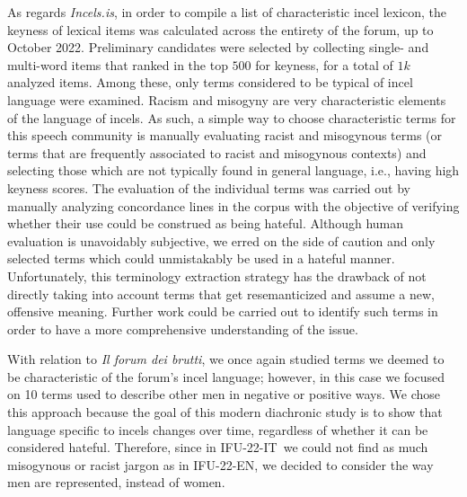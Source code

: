 \documentclass[11pt]{article}
\newcommand{\dsENcorpus}{IFU-22-EN}
\newcommand{\dsITcorpus}{IFU-22-IT}
\newcommand{\enforum}{\textit{Incels.is}}
\newcommand{\itforum}{\textit{Il forum dei brutti}}
\begin{document}
As regards \enforum, in order to compile a list of characteristic incel lexicon, the keyness of lexical items was calculated across the entirety of the forum, up to October 2022. Preliminary candidates were selected by 
collecting single- and multi-word items that ranked in the top $500$ for keyness, for a total of $1k$ analyzed items.  Among these, only terms considered to be typical of incel language were examined. Racism and misogyny are very characteristic elements of the language of incels. As such, a simple way to choose characteristic terms for this speech community is manually evaluating racist and misogynous terms (or terms that are frequently associated to racist and misogynous contexts) and selecting those which are not typically found in general language, i.e., having high keyness scores.
The evaluation of the individual terms was carried out by manually analyzing concordance lines in the corpus with the objective of verifying whether their use could be construed as being hateful. Although human evaluation is unavoidably subjective, we erred on the side of caution and only selected terms which could unmistakably be used in a hateful manner. Unfortunately, this terminology extraction strategy has the drawback of not directly taking into account terms that get resemanticized and assume a new, offensive meaning. Further work could be carried out to identify such terms in order to have a more comprehensive understanding of the issue.

With relation to \itforum, we once again studied terms we deemed to be characteristic of the forum's incel language; however, in this case we focused on 10 terms used to describe other men in negative or positive ways. We chose this approach because the goal of this modern diachronic study is to show that language specific to incels changes over time, regardless of whether it can be considered hateful. Therefore, since in \dsITcorpus\, we could not find as much misogynous or racist jargon as in \dsENcorpus, we decided to consider the way men are represented, instead of women.

\end{document}
